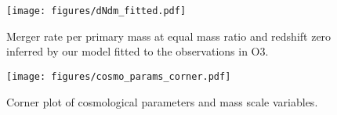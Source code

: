 \documentclass[modern]{aastex631}
\begin{document}
\begin{figure}
    \begin{center}
        \texttt{[image: figures/dNdm\_fitted.pdf]}
    \end{center}
    \caption{Merger rate per primary mass at equal mass ratio and redshift zero inferred by our model fitted to the observations in O3.}
    \label{fig:dNdm_fitted}
\end{figure}

\begin{figure}
    \begin{center}
        \texttt{[image: figures/cosmo\_params\_corner.pdf]}
    \end{center}
    \caption{Corner plot of cosmological parameters and mass scale variables.}
    \label{fig:cosmo-params-corner}
\end{figure}


\end{document}
